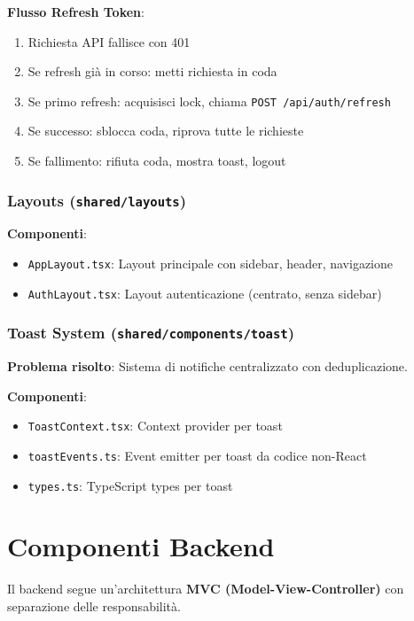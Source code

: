 \documentclass[11pt,a4paper]{article}
\begin{document}
\textbf{Flusso Refresh Token}:
\begin{enumerate}
    \item Richiesta API fallisce con 401
    \item Se refresh già in corso: metti richiesta in coda
    \item Se primo refresh: acquisisci lock, chiama \texttt{POST /api/auth/refresh}
    \item Se successo: sblocca coda, riprova tutte le richieste
    \item Se fallimento: rifiuta coda, mostra toast, logout
\end{enumerate}

\subsubsection{Layouts (\texttt{shared/layouts})}

\textbf{Componenti}:
\begin{itemize}
    \item \texttt{AppLayout.tsx}: Layout principale con sidebar, header, navigazione
    \item \texttt{AuthLayout.tsx}: Layout autenticazione (centrato, senza sidebar)
\end{itemize}

\subsubsection{Toast System (\texttt{shared/components/toast})}

\textbf{Problema risolto}: Sistema di notifiche centralizzato con deduplicazione.

\textbf{Componenti}:
\begin{itemize}
    \item \texttt{ToastContext.tsx}: Context provider per toast
    \item \texttt{toastEvents.ts}: Event emitter per toast da codice non-React
    \item \texttt{types.ts}: TypeScript types per toast
\end{itemize}

\section{Componenti Backend}

Il backend segue un'architettura \textbf{MVC (Model-View-Controller)} con separazione delle responsabilità.
\end{document}
